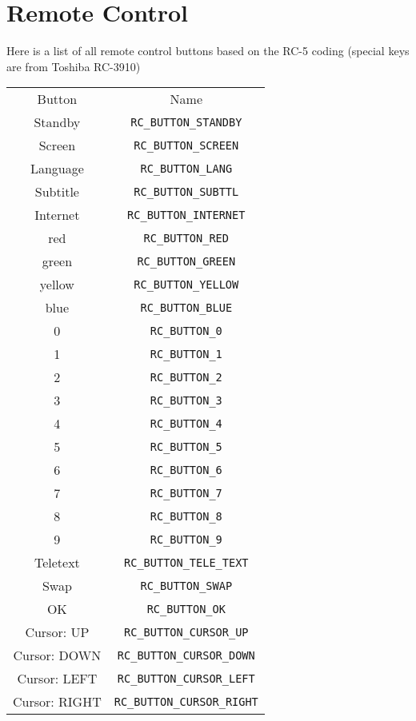 \documentclass[a4paper,9pt]{extarticle}
\begin{document}
\section{Remote Control}
Here is a list of all remote control buttons based on the RC-5 coding (special keys are from Toshiba RC-3910)

\begin{center} 
\begin{longtable}{cc}
    \rowcolor{blue!50}
    Button	         			& Name\\
    Standby & \texttt{RC\_BUTTON\_STANDBY}\\
    Screen & \texttt{RC\_BUTTON\_SCREEN}\\
    Language & \texttt{RC\_BUTTON\_LANG}\\
    Subtitle & \texttt{RC\_BUTTON\_SUBTTL}\\
    Internet & \texttt{RC\_BUTTON\_INTERNET}\\
    red & \texttt{RC\_BUTTON\_RED}\\
    green & \texttt{RC\_BUTTON\_GREEN}\\
    yellow & \texttt{RC\_BUTTON\_YELLOW}\\
    blue & \texttt{RC\_BUTTON\_BLUE}\\
    0 & \texttt{RC\_BUTTON\_0}\\
    1 & \texttt{RC\_BUTTON\_1}\\
    2 & \texttt{RC\_BUTTON\_2}\\
    3 & \texttt{RC\_BUTTON\_3}\\
    4 & \texttt{RC\_BUTTON\_4}\\
    5 & \texttt{RC\_BUTTON\_5}\\
    6 & \texttt{RC\_BUTTON\_6}\\
    7 & \texttt{RC\_BUTTON\_7}\\
    8 & \texttt{RC\_BUTTON\_8}\\
    9 & \texttt{RC\_BUTTON\_9}\\
    Teletext & \texttt{RC\_BUTTON\_TELE\_TEXT}\\
    Swap & \texttt{RC\_BUTTON\_SWAP}\\
    OK & \texttt{RC\_BUTTON\_OK}\\
    Cursor: UP & \texttt{RC\_BUTTON\_CURSOR\_UP}\\
    Cursor: DOWN & \texttt{RC\_BUTTON\_CURSOR\_DOWN}\\
    Cursor: LEFT & \texttt{RC\_BUTTON\_CURSOR\_LEFT}\\
    Cursor: RIGHT & \texttt{RC\_BUTTON\_CURSOR\_RIGHT}\\

\end{longtable}
\end{center}
\end{document}
